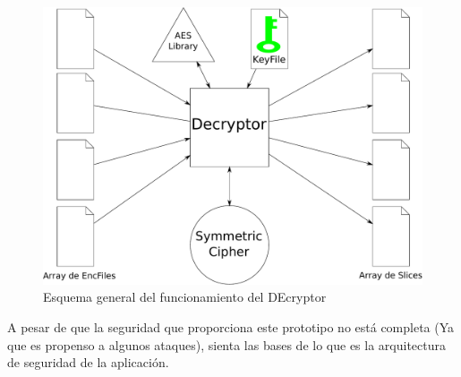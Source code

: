 \begin{figure}[ht]
  \centering
  \includegraphics[scale=0.5]{Figures/Decryptor}
  \decoRule
  \caption[Decryptor]{Esquema general del funcionamiento del DEcryptor}
  \label{fig:Decryptor}
\end{figure}

A pesar de que la seguridad que proporciona este prototipo no está completa (Ya
que es propenso a algunos ataques), sienta las bases de lo que es la arquitectura
de seguridad de la aplicación.
